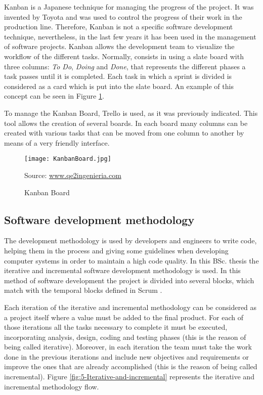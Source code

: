 \documentclass{pre-tfg}
\begin{document}
Kanban \cite{Gar11,KS10} is a Japanese technique for managing the progress of the project. It was invented by Toyota and was used to control the progress of their work in the production line. Therefore, Kanban is not a specific software development technique, nevertheless, in the last few years it has been used in the management of software projects. Kanban allows the development team to visualize the workflow of the different tasks. Normally, consists in using a slate board with three columns: \emph{To Do}, \emph{Doing} and \emph{Done}, that represents the different phases a task passes until it is completed. Each task in which a sprint is divided is considered as a card which is put into the slate board. An example of this concept can be seen in Figure \ref{fig:5-KanbanBoard}.

To manage the Kanban Board, Trello is used, as it was previously indicated. This tool allows the creation of several boards. In each board many columns can be created with various tasks that can be moved from one column to another by means of a very friendly interface.

\begin{figure}[!h]
	\begin{center}
		\texttt{[image: KanbanBoard.jpg]}
		\caption{Kanban Board}
		\label{fig:5-KanbanBoard}{Source: \url{www.qe2ingenieria.com}}
	\end{center}
\end{figure}

\subsection{Software development methodology}
The development methodology is used by developers and engineers to write code, helping them in the process and giving some guidelines when developing computer systems in order to maintain a high code quality. In this BSc. thesis the iterative and incremental software development methodology is used. In this method of software development the project is divided into several blocks, which match with the temporal blocks defined in Scrum \cite{ItIncr}. 

Each iteration of the iterative and incremental methodology can be considered as a project itself where a value must be added to the final product. For each of those iterations all the tasks necessary to complete it must be executed, incorporating analysis, design, coding and testing phases (this is the reason of being called iterative). Moreover, in each iteration the team must take the work done in the previous iterations and include new objectives and requirements or improve the ones that are already accomplished (this is the reason of being called incremental). Figure \ref{fig:5-Iterative-and-incremental} represents the iterative and incremental methodology flow.
\end{document}
